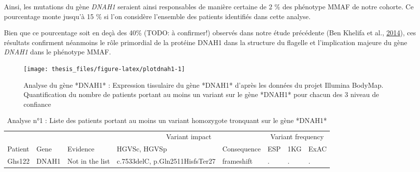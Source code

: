 \documentclass[12pt,twoside]{reedthesis}
\theoremstyle{definition}
\theoremstyle{definition}
\theoremstyle{remark}
\begin{document}
  Ainsi, les mutations du gène \emph{DNAH1} seraient ainsi responsables de
  manière certaine de 2 \% des phénotype MMAF de notre cohorte. Ce
  pourcentage monte jusqu'à 15 \% si l'on considère l'ensemble des
  patients identifiés dans cette analyse.
  
  Bien que ce pourcentage soit en deçà des 40\% (TODO: à confirmer!)
  observés dans notre étude précédente (Ben Khelifa et al.,
  \protect\hyperlink{ref-BenKhelifa2014}{2014}), ces résultats confirment
  néanmoins le rôle primordial de la protéine DNAH1 dans la structure du
  flagelle et l'implication majeure du gène \emph{DNAH1} dans le phénotype
  MMAF.
  
  \newpage
  
  \begin{figure}
  
  {\centering \texttt{[image: thesis\_files/figure-latex/plotdnah1-1]} 
  
  }
  
  \caption[Analyse du gène *DNAH1*]{Analyse du gène *DNAH1* : Expression tissulaire du gène *DNAH1* d'après les données du projet Illumina BodyMap. Quantification du nombre de patients portant au moins un variant sur le gène *DNAH1* pour chacun des 3 niveau de confiance}\label{fig:plotdnah1}
  \end{figure}
  
  \newpage
  
  \begin{landscape}
  \begin{longtable}[t]{llllllll}
  \caption{\label{tab:tabdnah1high}Analyse n°1 : Liste des patients portant au moins un variant homozygote tronquant sur le gène *DNAH1*}\\
  \toprule
  \multicolumn{1}{c}{ } & \multicolumn{1}{c}{ } & \multicolumn{1}{c}{ } & \multicolumn{2}{c}{Variant impact} & \multicolumn{3}{c}{Variant frequency} \\
  \cmidrule(l{2pt}r{2pt}){4-5} \cmidrule(l{2pt}r{2pt}){6-8}
  Patient & Gene & Evidence & HGVSc, HGVSp & Consequence & ESP & 1KG & ExAC\\
  \midrule
  Ghs122 & DNAH1 & Not in the list & c.7533delC, p.Gln2511HisfsTer27 & frameshift & . & . & .\\
  \bottomrule
  \end{longtable}
  \end{landscape}
  
\end{document}

